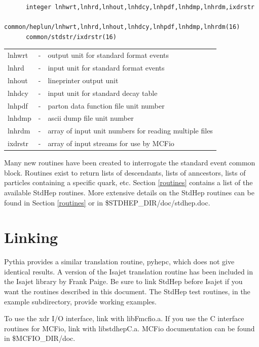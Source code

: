 \begin{verbatim}
      integer lnhwrt,lnhrd,lnhout,lnhdcy,lnhpdf,lnhdmp,lnhrdm,ixdrstr
      common/heplun/lnhwrt,lnhrd,lnhout,lnhdcy,lnhpdf,lnhdmp,lnhrdm(16)
      common/stdstr/ixdrstr(16)
\end{verbatim}
\begin{center}
\begin{tabular}{lcl}
lnhwrt&-&output unit for standard format events \\
lnhrd &-&input unit for standard format events \\
lnhout&-&lineprinter output unit\\
lnhdcy&-&input unit for standard decay table \\
lnhpdf&-&parton data function file unit number\\
lnhdmp&-&ascii dump file unit number \\
lnhrdm&-&array of input unit numbers for reading multiple files\\
ixdrstr&-&array of input streams for use by MCFio \\
\end{tabular}
\end{center}

Many new routines have been created to
interrogate the standard event common block.
Routines exist to return lists of descendants,
lists of anncestors, lists of particles containing a specific quark, etc.
Section \ref{routines} contains a list of the available StdHep routines.
More extensive details on the StdHep routines can be found in Section
\ref{routines} or in \$STDHEP\_DIR/doc/stdhep.doc.

\section { Linking}

Pythia provides a similar translation routine, pyhepc,
which does not give identical results.
A version of the Isajet translation routine has been included in the Isajet
library by Frank Paige.  Be sure to link StdHep before Isajet if you want
the routines described in this document.
The StdHep test routines, in the example subdirectory,
provide working examples.

To use the xdr I/O interface, link with libFmcfio.a.
If you use the C interface routines for MCFio, link with libstdhepC.a.
MCFio documentation can be found in \$MCFIO\_DIR/doc.

